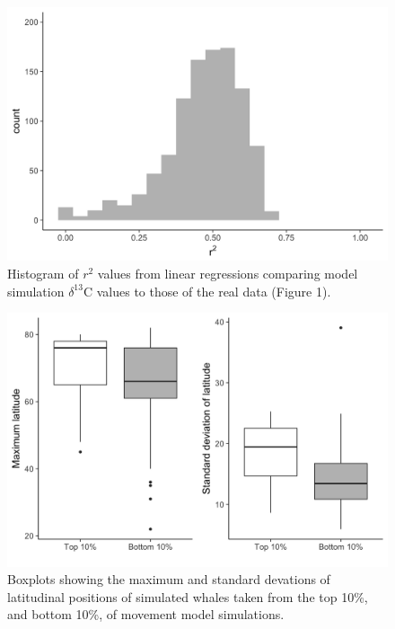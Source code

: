 \documentclass[a4paper,12pt]{article}
\begin{document}
  \begin{figure}[!htbp]
    \centering
      \includegraphics[width=\linewidth]{figures/Figure-S5-r2.png}
      \caption{Histogram of $r^2$ values from linear regressions comparing model simulation $\delta^{13}$C values to those of the real data (Figure 1).} %
      \label{figs6}
  \end{figure}

    \begin{figure}[!htbp]
    \centering
      \includegraphics[width=\linewidth]{figures/Figure-S6-boxplots.png}
      \caption{Boxplots showing the maximum and standard devations of latitudinal positions of simulated whales taken from the top 10\%, and bottom 10\%, of movement model simulations.} %
      \label{figs7}
  \end{figure}
\end{document}
